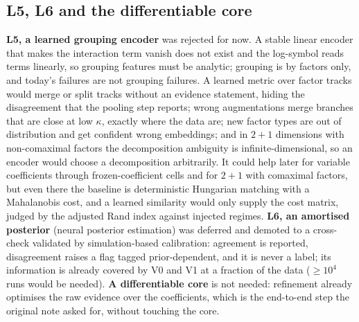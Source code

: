 \documentclass[11pt]{article}
\theoremstyle{plain}
\theoremstyle{definition}
\theoremstyle{remark}
\begin{document}
\subsection{L5, L6 and the differentiable core}
\textbf{L5, a learned grouping encoder} was rejected for now. A stable linear encoder that makes the interaction term vanish does not exist and the log-symbol reads terms linearly, so grouping features must be analytic; grouping is by factors only, and today's failures are not grouping failures.
A learned metric over factor tracks would merge or split tracks without an evidence statement, hiding the disagreement that the pooling step reports; wrong augmentations merge branches that are close at low $\kappa$, exactly where the data are; new factor types are out of distribution and get confident wrong embeddings;
and in $2{+}1$ dimensions with non-comaximal factors the decomposition ambiguity is infinite-dimensional, so an encoder would choose a decomposition arbitrarily. It could help later for variable coefficients through frozen-coefficient cells and for $2{+}1$ with comaximal factors, but even there the baseline is deterministic Hungarian matching with a Mahalanobis cost, and a learned similarity would only supply the cost matrix, judged by the adjusted Rand index against injected regimes.
\textbf{L6, an amortised posterior} (neural posterior estimation) was deferred and demoted to a cross-check validated by simulation-based calibration: agreement is reported, disagreement raises a flag tagged prior-dependent, and it is never a label; its information is already covered by V0 and V1 at a fraction of the data ($\ge10^4$ runs would be needed).
\textbf{A differentiable core} is not needed: refinement already optimises the raw evidence over the coefficients, which is the end-to-end step the original note asked for, without touching the core.
\end{document}
